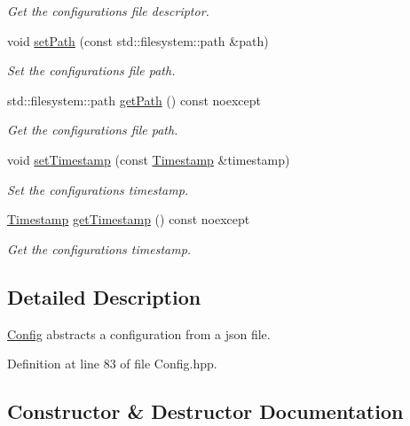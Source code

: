 \begin{DoxyCompactItemize}
\begin{DoxyCompactList}\small\item\em Get the configuration\textquotesingle{}s file descriptor. \end{DoxyCompactList}\item 
void \hyperlink{classcfg_1_1_config_a4c237371c0ad09ff75d1db7d31a1f362}{set\+Path} (const std\+::filesystem\+::path \&path)
\begin{DoxyCompactList}\small\item\em Set the configuration\textquotesingle{}s file path. \end{DoxyCompactList}\item 
std\+::filesystem\+::path \hyperlink{classcfg_1_1_config_aec545d9dc88130f76bfb6f2a1863b22f}{get\+Path} () const noexcept
\begin{DoxyCompactList}\small\item\em Get the configuration\textquotesingle{}s file path. \end{DoxyCompactList}\item 
void \hyperlink{classcfg_1_1_config_aae2d7dbb7d3d329f1afffef4b95de204}{set\+Timestamp} (const \hyperlink{namespacecfg_aa17d58439174a5af7fb3f37a3cdd6d0b}{Timestamp} \&timestamp)
\begin{DoxyCompactList}\small\item\em Set the configuration\textquotesingle{}s timestamp. \end{DoxyCompactList}\item 
\hyperlink{namespacecfg_aa17d58439174a5af7fb3f37a3cdd6d0b}{Timestamp} \hyperlink{classcfg_1_1_config_acbd974221e2b58f235b596ec3a52c44c}{get\+Timestamp} () const noexcept
\begin{DoxyCompactList}\small\item\em Get the configuration\textquotesingle{}s timestamp. \end{DoxyCompactList}\end{DoxyCompactItemize}


\subsection{Detailed Description}
\hyperlink{classcfg_1_1_config}{Config} abstracts a configuration from a json file. 

Definition at line 83 of file Config.\+hpp.



\subsection{Constructor \& Destructor Documentation}
\mbox{\label{classcfg_1_1_config_aac0ac15a2f06b8810164441fe08fe490}} 
